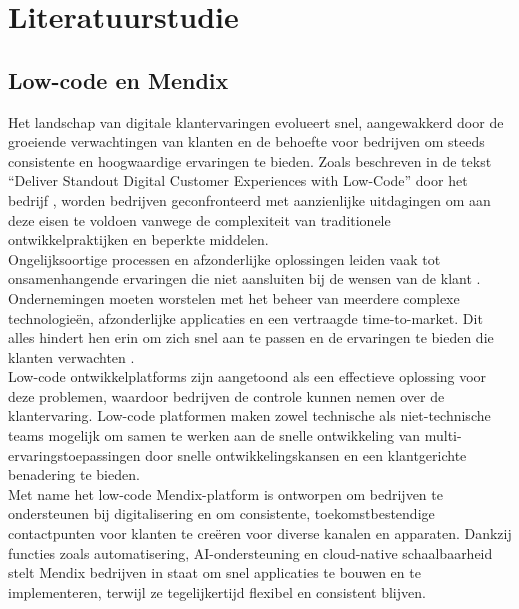 
\section{Literatuurstudie}%
\label{sec:literatuurstudie}
\subsection{Low-code en Mendix}
Het landschap van digitale klantervaringen evolueert snel, aangewakkerd door de groeiende verwachtingen van klanten en de behoefte voor bedrijven om steeds consistente en hoogwaardige ervaringen te bieden. Zoals beschreven in de tekst “Deliver Standout Digital Customer Experiences with Low-Code” door het bedrijf \textcite{Mendix}, worden bedrijven geconfronteerd met aanzienlijke uitdagingen om aan deze eisen te voldoen vanwege de complexiteit van traditionele ontwikkelpraktijken en beperkte middelen.
\\
Ongelijksoortige processen en afzonderlijke oplossingen leiden vaak tot onsamenhangende ervaringen die niet aansluiten bij de wensen van de klant \autocite{Mendix}. Ondernemingen moeten worstelen met het beheer van meerdere complexe technologieën, afzonderlijke applicaties en een vertraagde time-to-market. Dit alles hindert hen erin om zich snel aan te passen en de ervaringen te bieden die klanten verwachten .
\\
Low-code ontwikkelplatforms zijn aangetoond als een effectieve oplossing voor deze problemen, waardoor bedrijven de controle kunnen nemen over de klantervaring. Low-code platformen maken zowel technische als niet-technische teams mogelijk om samen te werken aan de snelle ontwikkeling van multi-ervaringstoepassingen door snelle ontwikkelingskansen en een klantgerichte benadering te bieden.
\\
Met name het low-code Mendix-platform is ontworpen om bedrijven te ondersteunen bij digitalisering en om consistente, toekomstbestendige contactpunten voor klanten te creëren voor diverse kanalen en apparaten. Dankzij functies zoals automatisering, AI-ondersteuning en cloud-native schaalbaarheid stelt Mendix bedrijven in staat om snel applicaties te bouwen en te implementeren, terwijl ze tegelijkertijd flexibel en consistent blijven. ~\autocite{Mendix}

